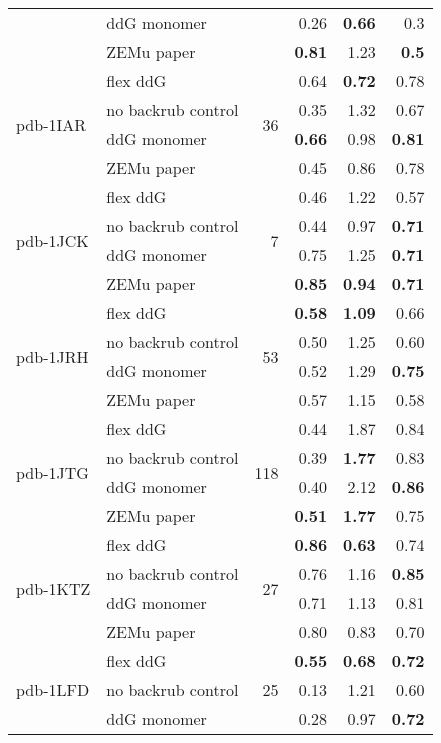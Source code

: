 {\begin{longtable}{llrrrr}
 & ddG monomer & & 0.26 & \textbf{0.66} & 0.3  \\
 & ZEMu paper & & \textbf{0.81} & 1.23 & \textbf{0.5}  \\
\hline
 \multirow{ 4}{*}{pdb-1IAR} & flex ddG & \multirow{ 4}{*}{36} & 0.64 & \textbf{0.72} & 0.78  \\
 & no backrub control & & 0.35 & 1.32 & 0.67  \\
 & ddG monomer & & \textbf{0.66} & 0.98 & \textbf{0.81}  \\
 & ZEMu paper & & 0.45 & 0.86 & 0.78  \\
\hline
 \multirow{ 4}{*}{pdb-1JCK} & flex ddG & \multirow{ 4}{*}{7} & 0.46 & 1.22 & 0.57  \\
 & no backrub control & & 0.44 & 0.97 & \textbf{0.71}  \\
 & ddG monomer & & 0.75 & 1.25 & \textbf{0.71}  \\
 & ZEMu paper & & \textbf{0.85} & \textbf{0.94} & \textbf{0.71}  \\
\hline
 \multirow{ 4}{*}{pdb-1JRH} & flex ddG & \multirow{ 4}{*}{53} & \textbf{0.58} & \textbf{1.09} & 0.66  \\
 & no backrub control & & 0.50 & 1.25 & 0.60  \\
 & ddG monomer & & 0.52 & 1.29 & \textbf{0.75}  \\
 & ZEMu paper & & 0.57 & 1.15 & 0.58  \\
\hline
 \multirow{ 4}{*}{pdb-1JTG} & flex ddG & \multirow{ 4}{*}{118} & 0.44 & 1.87 & 0.84  \\
 & no backrub control & & 0.39 & \textbf{1.77} & 0.83  \\
 & ddG monomer & & 0.40 & 2.12 & \textbf{0.86}  \\
 & ZEMu paper & & \textbf{0.51} & \textbf{1.77} & 0.75  \\
\hline
 \multirow{ 4}{*}{pdb-1KTZ} & flex ddG & \multirow{ 4}{*}{27} & \textbf{0.86} & \textbf{0.63} & 0.74  \\
 & no backrub control & & 0.76 & 1.16 & \textbf{0.85}  \\
 & ddG monomer & & 0.71 & 1.13 & 0.81  \\
 & ZEMu paper & & 0.80 & 0.83 & 0.70  \\
\hline
 \multirow{ 4}{*}{pdb-1LFD} & flex ddG & \multirow{ 4}{*}{25} & \textbf{0.55} & \textbf{0.68} & \textbf{0.72}  \\
 & no backrub control & & 0.13 & 1.21 & 0.60  \\
 & ddG monomer & & 0.28 & 0.97 & \textbf{0.72}  \\

\end{longtable}}
